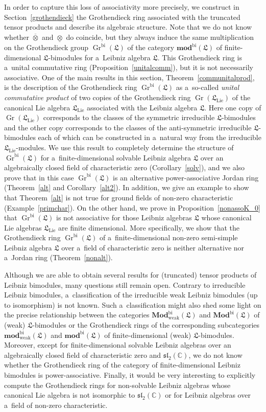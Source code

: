 \documentclass{jonasart}
\DeclareMathOperator{\bi}{bi}
\DeclareMathOperator{\K}{Gr}
\DeclareMathOperator{\lie}{Lie}
\DeclareMathOperator{\weak}{weak}
\newcommand{\cbb}{\mathbb{C}}
\newcommand{\fdmod}{\mathbf{mod}}
\newcommand{\lf}{\mathfrak{L}}
\newcommand{\Mod}{\mathbf{Mod}}
\newcommand{\ovo}{\overline{\otimes}}
\newcommand{\slf}{\mathfrak{sl}}
\newcommand{\und}{\underline{\otimes}}
\begin{document}
	In order to capture this loss of associativity more precisely, we construct in Section~\ref{grothendieck} the Grothendieck ring associated with the truncated tensor products and describe its algebraic structure. Note that we do not know whether $\ovo$ and $\und$ do coincide, but they always induce the same multiplication on the Grothendieck group $\K^{\bi}(\lf)$ of the category $\fdmod^{\bi}(\lf)$ of finite-dimensional $\lf$-bimodules for a~Leibniz algebra $\lf$. This Grothendieck ring is a~unital commutative ring (Proposition~\ref{unitalcomm}), but it is not necessarily associative. One of the main results in this section, Theorem~\ref{communitalprod}, is the description of the Grothendieck ring $\K^{\bi}(\lf)$ as a~so-called \textit{unital commutative product\/} of two copies of the Grothendieck ring $\K(\lf_{\lie})$ of the canonical Lie algebra $\lf_{\lie}$ associated with the Leibniz algebra $\lf$. Here one copy of $\K(\lf_{\lie})$ corresponds to the classes of the symmetric irreducible $\lf$-bimodules and the other copy corresponds to the classes of the anti-symmetric irreducible $\lf$-bimodules each of which can be constructed in a~natural way from the irreducible $\lf_{\lie}$-modules. We use this result to completely determine the structure of $\K^{\bi}(\lf)$ for a~finite-dimensional solvable Leibniz algebra $\lf$ over an algebraically closed field of characteristic zero (Corollary~\ref{solv}), and we also prove that in this case $\K^{\bi}(\lf)$ is an alternative power-associative Jordan ring (Theorem~\ref{alt} and Corollary~\ref{alt2}). In addition, we give an example to show that Theorem~\ref{alt} is not true for ground fields of non-zero characteristic (Example~\ref{primchar}). On the other hand, we prove in Proposition~\ref{nonassoK_0} that $\K^{\bi}(\lf)$ is not associative for those Leibniz algebras $\lf$ whose canonical Lie algebras $\lf_{\lie}$ are finite dimensional. More specifically, we show that the Grothendieck ring $\K^{\bi}(\lf)$ of a~finite-dimensional non-zero semi-simple Leibniz algebra $\lf$ over a~field of characteristic zero is neither alternative nor a~Jordan ring (Theorem~\ref{nonalt}).
\medskip 

	Although we are able to obtain several results for (truncated) tensor products of
	Leibniz bimodules, many questions still remain open. Contrary to irreducible Leibniz bimodules, a~classification of the irreducible weak Leibniz bimodules (up to isomorphism)
	is not known. Such a~classification might also shed some light on the precise relationship between the categories $\Mod^{\bi}_{\weak}(\lf)$ and $\Mod^{\bi}(\lf)$ of (weak)
	$\lf$-bimodules or the Grothendieck rings of the corresponding subcategories
	$\fdmod^{\bi}_{\weak}(\lf)$ and $\fdmod^{\bi}(\lf)$ of finite-dimensional (weak)
	$\lf$-bimodules. Moreover, except for finite-dimensional solvable Leibniz algebras over an algebraically closed field of characteristic zero and $\slf_2 (\cbb)$, we do not know whether the Grothendieck ring of the category of finite-dimensional
	Leibniz bimodules is power-associative. Finally, it would be very interesting to explicitly compute the Grothendieck rings for non-solvable Leibniz algebras whose canonical Lie algebra is not isomorphic to $\slf_2 (\cbb)$ or for Leibniz algebras over a~field of non-zero characteristic.
\medskip 
\end{document}
